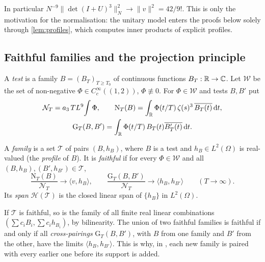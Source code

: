 \documentclass[11pt,colorlinks]{charlie}
\newcommand{\Om}{\Omega}
\newcommand{\ip}[2]{\langle #1,#2\rangle}
\begin{document}
\begin{remark}
In particular $N^{-9}\|\det(I+U)^3\|_N^2\to\|v\|^2=42/9!$. This is only the motivation for the normalisation: the unitary model enters the proofs below solely through \cref{lem:profiles}, which computes inner products of explicit profiles.
\end{remark}

\subsection{Faithful families and the projection principle}
A \emph{test} is a family $B=(B_T)_{T\ge T_0}$ of continuous functions $B_T:\mathbb{R}\to\mathbb{C}$. Let $\mathcal W$ be the set of non-negative $\Phi\in C_c^\infty((1,2))$, $\Phi\not\equiv0$. For $\Phi\in\mathcal W$ and tests $B,B'$ put
\begin{gather*}
 \mathcal N_T=a_3\,TL^9\!\int\Phi,\qquad
 \mathrm N_T(B)=\int_{\mathbb{R}}\Phi(t/T)\,\zeta(s)^3\,\overline{B_T(t)}\,\mathrm{d} t,\\
 \mathrm G_T(B,B')=\int_{\mathbb{R}}\Phi(t/T)\,B_T(t)\overline{B'_T(t)}\,\mathrm{d} t .
\end{gather*}
\begin{definition}\label{def:faithful}
A \emph{family} is a set $\mathcal T$ of pairs $(B,h_B)$, where $B$ is a test and $h_B\in L^2(\Om)$ is real-valued (the \emph{profile} of $B$). It is \emph{faithful} if for every $\Phi\in\mathcal W$ and all $(B,h_B),(B',h_{B'})\in\mathcal T$,
\[
 \frac{\mathrm N_T(B)}{\mathcal N_T}\to\ip{v}{h_B},\qquad
 \frac{\mathrm G_T(B,B')}{\mathcal N_T}\to\ip{h_B}{h_{B'}}\qquad(T\to\infty).
\]
Its \emph{span} $\mathcal H(\mathcal T)$ is the closed linear span of $\{h_B\}$ in $L^2(\Om)$.
\end{definition}

If $\mathcal T$ is faithful, so is the family of all finite real linear combinations $(\sum c_iB_i,\sum c_ih_{B_i})$, by bilinearity. The union of two faithful families is faithful if and only if all \emph{cross-pairings} $\mathrm G_T(B,B')$, with $B$ from one family and $B'$ from the other, have the limits $\ip{h_B}{h_{B'}}$. This is why, in , each new family is paired with every earlier one before its support is added.
\end{document}
